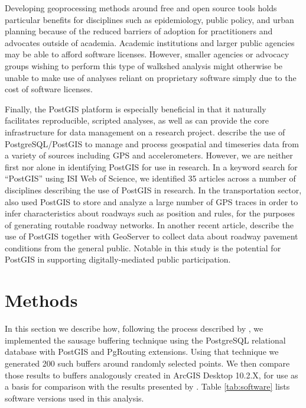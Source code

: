 \documentclass[11pt,letterpaper]{article} %
\begin{document}
Developing geoprocessing methods around free and open source tools
holds particular benefits for disciplines such as epidemiology, public
policy, and urban planning because of the reduced barriers of adoption
for practitioners and advocates outside of academia. Academic
institutions and larger public agencies may be able to afford software
licenses. However, smaller agencies or advocacy groups wishing to
perform this type of walkshed analysis might otherwise be unable to
make use of analyses reliant on proprietary software simply due to the
cost of software licenses.

Finally, the PostGIS platform is especially beneficial in that it
naturally facilitates reproducible, scripted analyses, as well as can
provide the core infrastructure for data management on a research
project. \textcite{hurvitz2014emerging} describe the use of
PostgreSQL/PostGIS to manage and process geospatial and timeseries
data from a variety of sources including GPS and
accelerometers. However, we are neither first nor alone in identifying
PostGIS for use in research. In a keyword search for ``PostGIS'' using
ISI Web of Science, we identified 35 articles across a number of
disciplines describing the use of PostGIS in research. In the
transportation sector, \textcite{Wang2015routable} also used PostGIS
to store and analyze a large number of GPS traces in order to infer
characteristics about roadways such as position and rules, for the
purposes of generating routable roadway networks. In another recent
article, \textcite{Brovelli2015FOSS} describe the use of PostGIS
together with GeoServer to collect data about roadway pavement
conditions from the general public. Notable in this study is the
potential for PostGIS in supporting digitally-mediated public
participation.



\section*{Methods}
In this section we describe how, following the process described by
\textcite{Forsyth2014sausage, Forsyth2012proto}, we implemented the
sausage buffering technique using the PostgreSQL relational database
with PostGIS and PgRouting extensions. Using that technique we
generated 200 such buffers around randomly selected points. We then
compare those results to buffers analogously created in ArcGIS Desktop
10.2.X, for use as a basis for comparison with the results presented
by \citeauthor{Forsyth2014sausage}. Table \ref{tab:software} lists
software versions used in this analysis.
\end{document}
